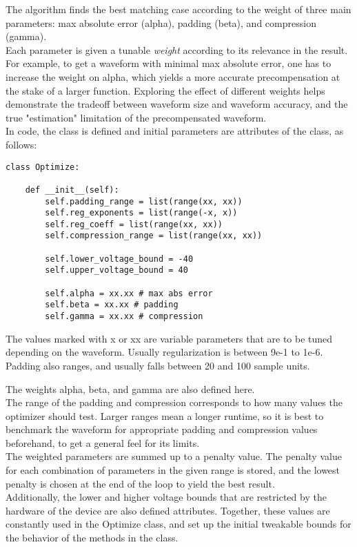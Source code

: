 The algorithm finds the best matching case according to the weight of three main parameters: max absolute error (alpha), padding (beta), and compression (gamma).
\\
Each parameter is given a tunable \textit{weight} according to its relevance in the result. For example, to get a waveform with minimal max absolute error, one has to increase the weight on alpha, which yields a more accurate precompensation at the stake of a larger function. Exploring the effect of different weights helps demonstrate the tradeoff between waveform size and waveform accuracy, and the true "estimation" limitation of the precompensated waveform.
\\
In code, the class is defined and initial parameters are attributes of the class, as follows:

\begin{verbatim}
class Optimize:
        
    def __init__(self):
        self.padding_range = list(range(xx, xx))
        self.reg_exponents = list(range(-x, x))      
        self.reg_coeff = list(range(xx, xx))
        self.compression_range = list(range(xx, xx))
        
        self.lower_voltage_bound = -40
        self.upper_voltage_bound = 40

        self.alpha = xx.xx # max abs error
        self.beta = xx.xx # padding
        self.gamma = xx.xx # compression
\end{verbatim}

The values marked with x or xx are variable parameters that are to be tuned depending on the waveform. Usually regularization is between 9e-1 to 1e-6. Padding also ranges, and usually falls between 20 and 100 sample units. 

The weights alpha, beta, and gamma are also defined here. 
\\
The range of the padding and compression corresponds to how many values the optimizer should test. Larger ranges mean a longer runtime, so it is best to benchmark the waveform for appropriate padding and compression values beforehand, to get a general feel for its limits.
\\
The weighted parameters are summed up to a penalty value. The penalty value for each combination of parameters in the given range is stored, and the lowest penalty is chosen at the end of the loop to yield the best result.
\\
Additionally, the lower and higher voltage bounds that are restricted by the hardware of the device are also defined attributes. Together, these values are constantly used in the Optimize class, and set up the initial tweakable bounds for the behavior of the methods in the class.

